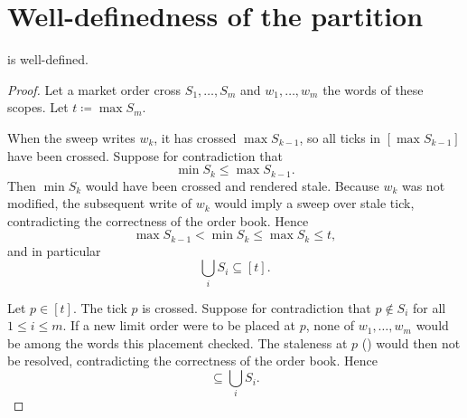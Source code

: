 \appendix
\section{Well-definedness of the partition} \label{app:partition}
\begin{lemma} \label{lem:partition}
     is well-defined.
\end{lemma}
\begin{proof}
    Let a market order cross $S_1,\dots,S_m$ and $w_1,\dots,w_m$ the words of these scopes. Let $t\coloneqq\max S_m$.

    When the sweep writes $w_k$, it has crossed $\max S_{k-1}$, so all ticks in $[\max S_{k-1}]$ have been crossed. Suppose for contradiction that
    \begin{equation*}
        \min S_k\leq\max S_{k-1}.
    \end{equation*}
    Then $\min S_k$ would have been crossed and rendered stale. Because $w_k$ was not modified, the subsequent write of $w_k$ would imply a sweep over stale tick, contradicting the correctness of the order book. Hence
    \begin{equation*}
        \max S_{k-1}<\min S_k\leq\max S_k\leq t,
    \end{equation*}
    and in particular
    \begin{equation*}
        \bigcup_{i}S_i\subseteq[t].
    \end{equation*}

    Let $p\in[t]$. The tick $p$ is crossed. Suppose for contradiction that $p\notin S_i$ for all $1\leq i\leq m$. If a new limit order were to be placed at $p$, none of $w_1,\dots,w_m$ would be among the words this placement checked. The staleness at $p$ () would then not be resolved, contradicting the correctness of the order book. Hence
    \begin{equation*}
        [t]\subseteq\bigcup_{i}S_i.
    \end{equation*}
\end{proof}